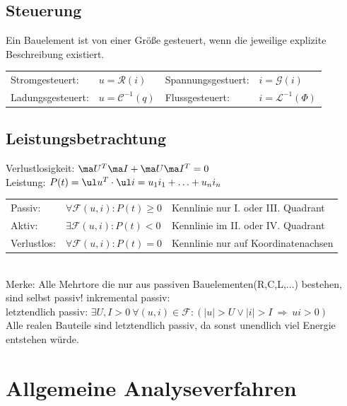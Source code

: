 \documentclass[fs, footer]{latex4ei}
\begin{document}
\begin{multicols*}{4}
	\subsection{Steuerung}
	Ein Bauelement ist von einer Größe gesteuert, wenn die jeweilige explizite Beschreibung existiert.\\
	\begin{tabular*}{\columnwidth}{@{\extracolsep\fill}llll@{}}
		Stromgesteuert: & $u=\mathcal R(i)$ & Spannungsgestuert: & $i=\mathcal G(i)$\\
		Ladungsgesteuert: & $u=\mathcal C^{-1}(q)$ & Flussgesteuert: & $i=\mathcal L^{-1}(\Phi)$
	\end{tabular*}

	\subsection{Leistungsbetrachtung}
	Verlustlosigkeit: $\ma U^T\ma I + \ma U\ma I^T = 0$\\
	Leistung: $P(t)=\ul u^T \cdot \ul i=u_1 i_1 + \dotsc + u_n i_n$ \\
	\begin{tabular*}{\columnwidth}{@{\extracolsep\fill}lll@{}}
		Passiv: & $\forall \mathcal F(u,i): P(t)\ge 0$ & Kennlinie nur I. oder III. Quadrant\\
		Aktiv: & $\exists \mathcal F(u,i): P(t)<0$ & Kennlinie im II. oder IV. Quadrant\\
		Verlustlos: & $\forall \mathcal F(u,i): P(t)=0$ & Kennlinie nur auf Koordinatenachsen\\
	\end{tabular*}\\
	Merke: Alle Mehrtore die nur aus passiven Bauelementen(R,C,L,...) bestehen, sind selbst passiv!
	inkremental passiv:\\
	letztendlich passiv: $\exists U,I>0 \ \forall (u,i) \in \mathcal F : (|u| > U \lor |i| > I \ \Rightarrow \ ui > 0)$\\
	Alle realen Bauteile sind letztendlich passiv, da sonst unendlich viel Energie entstehen würde.\\


\section{Allgemeine Analyseverfahren}



\end{multicols*}
\end{document}
